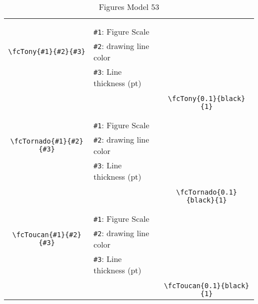 \documentclass[x11names]{article}
\begin{document}
\begin{table}[H]
\begin{tabular}{|c|l|c|}
	&&\multirow{5}{*}{\fcTony{0.1}{black}{1}}\\	&&\\	&\verb|#1|: Figure Scale &\\	\verb|\fcTony{#1}{#2}{#3}|&	\verb|#2|: drawing line color &\\	&\verb|#3|: Line thickness (pt) &\\ &&\\&&	\verb|\fcTony{0.1}{black}{1}|\\\hline 	
	&&\multirow{5}{*}{\fcTornado{0.1}{black}{1}}\\	&&\\	&\verb|#1|: Figure Scale &\\	\verb|\fcTornado{#1}{#2}{#3}|&	\verb|#2|: drawing line color &\\	&\verb|#3|: Line thickness (pt) &\\ &&\\&&	\verb|\fcTornado{0.1}{black}{1}|\\\hline 	
	&&\multirow{5}{*}{\fcToucan{0.1}{black}{1}}\\	&&\\	&\verb|#1|: Figure Scale &\\	\verb|\fcToucan{#1}{#2}{#3}|&	\verb|#2|: drawing line color &\\	&\verb|#3|: Line thickness (pt) &\\ &&\\&&	\verb|\fcToucan{0.1}{black}{1}|\\\hline 	\hline\end{tabular}\caption{Figures Model 53}\label{tab53}\end{table}
\end{document}

